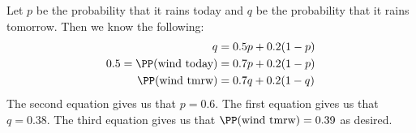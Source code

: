 Let $p$ be the probability that it rains today and $q$ be the probability that it rains tomorrow. Then we know the following:
	\begin{align*}
		q &= 0.5p+0.2(1-p) \\
		0.5 = \PP(\text{wind today}) &= 0.7p+0.2(1-p) \\
		\PP(\text{wind tmrw}) &= 0.7q+0.2(1-q)
	\end{align*}
	The second equation gives us that $p=0.6$. The first equation gives us that $q=0.38$. The third equation gives us that $\PP(\text{wind tmrw})=0.39$ as desired.